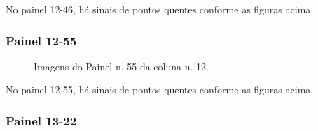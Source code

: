 \documentclass[dvipsnames]{article}%
\begin{document}
%
\FloatBarrier%
No painel 12{-}46, há sinais de pontos quentes conforme as figuras acima.\newline%
%
\subsubsection{Painel 12-55}%


\begin{figure}[h!]%
\centering%
%
\hfill%
%
\hfill%
%
\caption{Imagens do Painel n. 55 da coluna n. 12.}%
\end{figure}

%
\FloatBarrier%
No painel 12{-}55, há sinais de pontos quentes conforme as figuras acima.\newline%
%
\subsubsection{Painel 13-22}%
\end{document}
